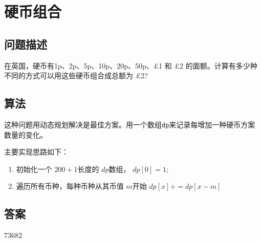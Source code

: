 \section{硬币组合}\label{sec:problem31}
\subsection{问题描述}
\begin{tcolorbox}

	在英国，硬币有1p、2p、5p、10p、20p、50p、£1 和 £2 的面额。计算有多少种不同的方式可以用这些硬币组合成总额为 £2?
\end{tcolorbox}

\subsection{算法}
这种问题用动态规划解决是最佳方案。用一个数组\texttt{dp}来记录每增加一种硬币方案数量的变化。

主要实现思路如下：
\begin{enumerate}
	\item 初始化一个 \( 200 + 1 \)长度的 \( dp \)数组， \( dp[0] = 1 \);
	\item 遍历所有币种，每种币种从其币值 \( m \)开始 \( dp[x] += dp[x - m] \)
\end{enumerate}

\subsection{答案}
73682
